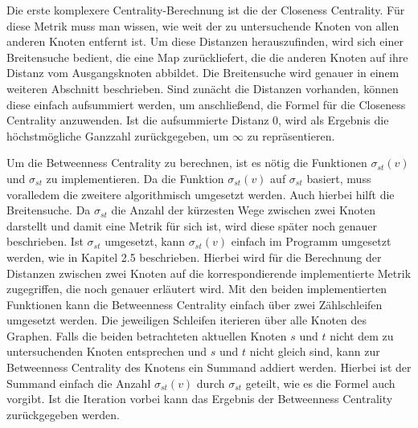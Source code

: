 \documentclass[a4paper,12pt,ngerman,chapterprefix=false,listof=totoc,bibliography=totoc]{scrreprt}
\begin{document}
{{{Die erste komplexere Centrality-Berechnung ist die der Closeness Centrality. Für diese Metrik muss man wissen, wie weit der zu untersuchende Knoten von allen anderen Knoten entfernt ist. Um diese Distanzen herauszufinden, wird sich einer Breitensuche bedient, die eine Map zurückliefert, die die anderen Knoten auf ihre Distanz vom Ausgangsknoten abbildet. Die Breitensuche wird genauer in einem weiteren Abschnitt beschrieben. Sind zunächt die Distanzen vorhanden, können diese einfach aufsummiert werden, um anschließend, die Formel für die Closeness Centrality anzuwenden. Ist die aufsummierte Distanz 0, wird als Ergebnis die höchstmögliche Ganzzahl zurückgegeben, um \(\infty\) zu repräsentieren.

Um die Betweenness Centrality zu berechnen, ist es nötig die Funktionen \(\sigma_{st}(v)\) und \(\sigma_{st}\) zu implementieren. Da die Funktion \(\sigma_{st}(v)\) auf \(\sigma_{st}\) basiert, muss voralledem die zweitere algorithmisch umgesetzt werden. Auch hierbei hilft die Breitensuche. Da \(\sigma_{st}\) die Anzahl der kürzesten Wege zwischen zwei Knoten darstellt und damit eine Metrik für sich ist, wird diese später noch genauer beschrieben. Ist \(\sigma_{st}\) umgesetzt, kann \(\sigma_{st}(v)\) einfach im Programm umgesetzt werden, wie in Kapitel 2.5 beschrieben. Hierbei wird für die Berechnung der Distanzen zwischen zwei Knoten auf die korrespondierende implementierte Metrik zugegriffen, die noch genauer erläutert wird. Mit den beiden implementierten Funktionen kann die Betweenness Centrality einfach über zwei Zählschleifen umgesetzt werden. Die jeweiligen Schleifen iterieren über alle Knoten des Graphen. Falls die beiden betrachteten aktuellen Knoten \(s\) und \(t\) nicht dem zu untersuchenden Knoten entsprechen und \(s\) und \(t\) nicht gleich sind, kann zur Betweenness Centrality des Knotens ein Summand addiert werden. Hierbei ist der Summand einfach die Anzahl \(\sigma_{st}(v)\) durch \(\sigma_{st}\) geteilt, wie es die Formel auch vorgibt. Ist die Iteration vorbei kann das Ergebnis der Betweenness Centrality zurückgegeben werden.

}}}
\end{document}
